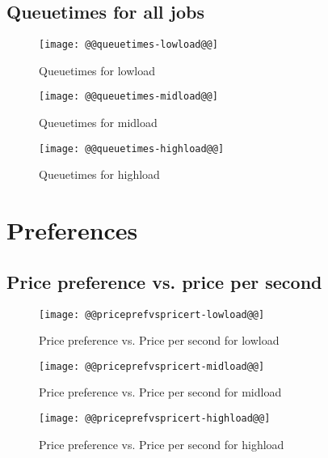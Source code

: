 \documentclass[11pt]{article}
\begin{document}
\newpage
\subsection{Queuetimes for all jobs}
\begin{figure}[htbp]
  \begin{center}
    \texttt{[image: @@queuetimes-lowload@@]}
    \caption{Queuetimes for lowload}
    \label{fig:queuetimes-lowload}
  \end{center}
\end{figure}
\begin{figure}[htbp]
  \begin{center}
    \texttt{[image: @@queuetimes-midload@@]}
    \caption{Queuetimes for midload}
    \label{fig:queuetimes-midload}
  \end{center}
\end{figure}
\begin{figure}[htbp]
  \begin{center}
    \texttt{[image: @@queuetimes-highload@@]}
    \caption{Queuetimes for highload}
    \label{fig:queuetimes-highload}
  \end{center}
\end{figure}



\newpage
\section{Preferences}
\subsection{Price preference vs. price per second}
\begin{figure}[htbp]
  \begin{center}
    \texttt{[image: @@priceprefvspricert-lowload@@]}
    \caption{Price preference vs. Price per second for lowload}
    \label{fig:priceprefvspricert-lowload}
  \end{center}
\end{figure}
\begin{figure}[htbp]
  \begin{center}
    \texttt{[image: @@priceprefvspricert-midload@@]}
    \caption{Price preference vs. Price per second for midload}
    \label{fig:priceprefvspricert-midload}
  \end{center}
\end{figure}
\begin{figure}[htbp]
  \begin{center}
    \texttt{[image: @@priceprefvspricert-highload@@]}
    \caption{Price preference vs. Price per second for highload}
    \label{fig:priceprefvspricert-highload}
  \end{center}
\end{figure}
\end{document}
